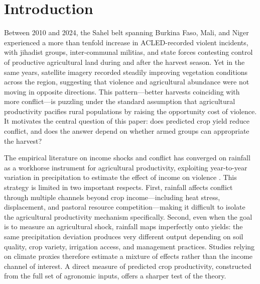 \section{Introduction}
\label{sec:intro}

Between 2010 and 2024, the Sahel belt spanning Burkina Faso, Mali, and Niger experienced a more than tenfold increase in ACLED-recorded violent incidents, with jihadist groups, inter-communal militias, and state forces contesting control of productive agricultural land during and after the harvest season. Yet in the same years, satellite imagery recorded steadily improving vegetation conditions across the region, suggesting that violence and agricultural abundance were not moving in opposite directions. This pattern---better harvests coinciding with more conflict---is puzzling under the standard assumption that agricultural productivity pacifies rural populations by raising the opportunity cost of violence. It motivates the central question of this paper: does predicted crop yield reduce conflict, and does the answer depend on whether armed groups can appropriate the harvest?

The empirical literature on income shocks and conflict has converged on rainfall as a workhorse instrument for agricultural productivity, exploiting year-to-year variation in precipitation to estimate the effect of income on violence \citep{MiguelSatyanathSergenti2004}. This strategy is limited in two important respects. First, rainfall affects conflict through multiple channels beyond crop income---including heat stress, displacement, and pastoral resource competition---making it difficult to isolate the agricultural productivity mechanism specifically. Second, even when the goal is to measure an agricultural shock, rainfall maps imperfectly onto yields: the same precipitation deviation produces very different output depending on soil quality, crop variety, irrigation access, and management practices. Studies relying on climate proxies therefore estimate a mixture of effects rather than the income channel of interest. A direct measure of predicted crop productivity, constructed from the full set of agronomic inputs, offers a sharper test of the theory.


